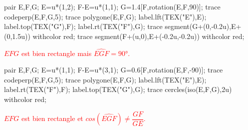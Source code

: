     \begin{minipage}{0.45\linewidth}
        \begin{Geometrie}
            pair E,F,G;
            E=u*(1,2);
            F-E=u*(1,1);
            G=1.4[F,rotation(E,F,90)];
            trace codeperp(E,F,G,5);
            trace polygone(E,F,G);
            label.lft(TEX("E"),E);
            label.top(TEX("G"),F);
            label.rt(TEX("F"),G);
            trace segment(G+(0,-0.2u),E+(0,1.5u)) withcolor red;
            trace segment(F+(u,0),E+(-0.2u,-0.2u)) withcolor red;
        \end{Geometrie}
        \textcolor{red}{$EFG$ est bien rectangle mais $\widehat{EGF}=\ang{90}$.}

        \bigskip
        \begin{Geometrie}
            pair E,F,G;
            E=u*(1,1);
            F-E=u*(3,1);
            G=0.6[F,rotation(E,F,-90)];
            trace codeperp(E,F,G,5);
            trace polygone(E,F,G);
            label.lft(TEX("E"),E);
            label.rt(TEX("F"),F);
            label.top(TEX("G"),G);
            trace cercles(iso(E,F,G),2u) withcolor red;
        \end{Geometrie}
        \textcolor{red}{$EFG$ est bien rectangle et $cos(\widehat{EGF})\neq\dfrac{GF}{GE}$.}
    \end{minipage}
